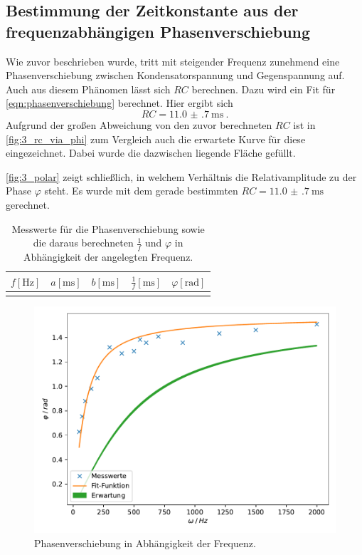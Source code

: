 \clearpage
\subsection{Bestimmung der Zeitkonstante aus der frequenzabhängigen Phasenverschiebung}
\label{auswertung:3}

Wie zuvor beschrieben wurde,
tritt mit steigender Frequenz zunehmend eine Phasenverschiebung zwischen Kondensatorspannung und Gegenspannung auf.
Auch aus diesem Phänomen lässt sich $RC$ berechnen.
Dazu wird ein Fit für \autoref{eqn:phasenverschiebung} berechnet.
Hier ergibt sich
\[ RC = \SI{11.0(7)}{\milli\second} \ . \]
Aufgrund der großen Abweichung von den zuvor berechneten $RC$ ist in \autoref{fig:3_rc_via_phi}
zum Vergleich auch die erwartete Kurve für diese eingezeichnet.
Dabei wurde die dazwischen liegende Fläche gefüllt.

\autoref{fig:3_polar} zeigt schließlich,
in welchem Verhältnis die Relativamplitude zu der Phase $\varphi$ steht.
Es wurde mit dem gerade bestimmten $RC = \SI{11.0(7)}{\milli\second}$ gerechnet.

\begin{table}
  \centering
  \caption{Messwerte für die Phasenverschiebung
  sowie die daraus berechneten $\frac{1}{f}$ und $\varphi$
  in Abhängigkeit der angelegten Frequenz.}
  \label{tab:3}
  \begin{tabular}{S[table-format=4.0] S[table-format=1.2] S[table-format=2.2] S[table-format=2.2] S[table-format=1.2]}
    \toprule
    $f [\si{\hertz}]$ &
    $a [\si{\milli\second}]$ &
    $b [\si{\milli\second}]$ &
    $\frac{1}{f} [\si{\milli\second}]$ &
    $\varphi [\si{\radian}]$ \\
    \midrule
    \bottomrule
  \end{tabular}
\end{table}

\begin{figure}
    \centering
    \includegraphics[width=\textwidth]{build/plt/3_rc_via_phi.pdf}
    \caption{Phasenverschiebung in Abhängigkeit der Frequenz.}
    \label{fig:3_rc_via_phi}
\end{figure}

